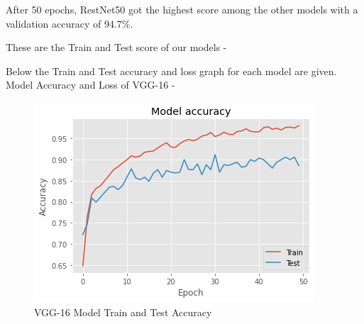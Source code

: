 \vspace{5mm}
\noindent After 50 epochs, RestNet50 got the highest score among the other models with a validation accuracy of 94.7\%.

\vspace{5mm}
\noindent These are the Train and Test score of our models - 

\begin{table}[hbt!]
\caption{Model Accuracy and Loss}
\label{tab:Model Accuracy and Loss}
\end{table}

\vspace{5mm}
\noindent Below the Train and Test accuracy and loss graph for each model are given.
\newpage
\vspace{5mm}
\noindent Model Accuracy and Loss of VGG-16 -

\vspace{5mm}
\begin{figure}[hbt!]
\centering
\includegraphics[scale=1]{images/fig-25.png}
\caption{VGG-16 Model Train and Test Accuracy}
\label{fig:x VGG-16 Model Train and Test Accuracy}
\end{figure}

